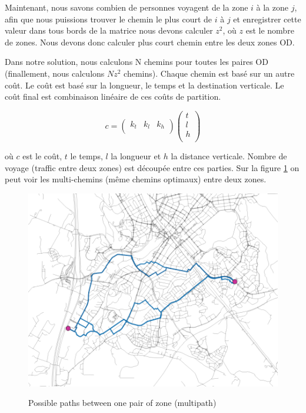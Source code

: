 
Maintenant, nous savons combien de personnes voyagent de la zone $i$ à la zone $j$, afin que nous puissions trouver le chemin le plus court de $i$ à $j$ et enregistrer cette valeur dans tous bords de la matrice nous devons calculer $z^2$, où $z$ est le nombre de zones. Nous devons donc calculer plus court chemin entre les deux zones OD.


Dans notre solution, nous calculons N chemins pour toutes les paires OD (finallement, nous calculons $N z^2$ chemins). Chaque chemin est basé sur un autre coût. Le coût est basé sur la longueur, le temps et la destination verticale. Le coût final est combinaison linéaire de ces coûts de partition.

$$c = \left(\begin{array}{ccc}
k_t & k_l & k_h\\
\end{array}\right) \left( \begin{array}{c}
t\\
l\\
h\\
\end{array} \right)$$


où $c$ est le coût, $t$ le temps, $l$ la longueur et $h$ la distance verticale. Nombre de voyage (traffic entre deux zones) est découpée entre ces parties. Sur la figure \ref{img.paths} on peut voir les multi-chemins (même chemins optimaux) entre deux zones.

\begin{figure}
  \includegraphics[width=12cm]{img/c01-transp-model/paths.png}
  \label{img.paths}
  \caption{Possible paths between one pair of zone (multipath)}
\end{figure}